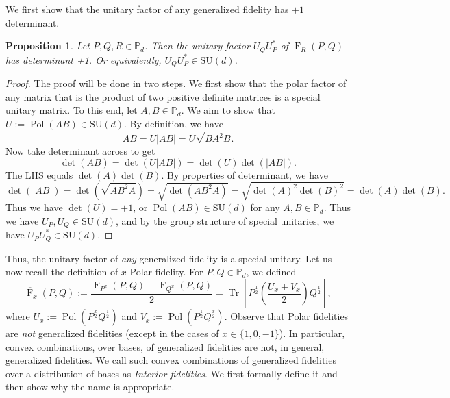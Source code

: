 \documentclass[12pt]{article}
\newtheorem{prop}[theorem]{Proposition}
\theoremstyle{definition}
\newcommand{\Fg}[3]{\operatorname{F}_{#3}\!\left(#1, #2\right)}
\begin{document}
We first show that the unitary factor of any generalized fidelity has $+1$ determinant. 
\begin{theorembox}
\begin{prop}
        Let $P,Q,R \in \mathbb P_d$. Then the unitary factor $U_Q U_P^*$ of $\operatorname{F}_R(P,Q) $ has determinant +1. Or equivalently, $U_Q U_P^* \in \mathrm{SU}(d)$.
\end{prop}
\end{theorembox}
\begin{proof}
    The proof will be done in two steps. We first show that the polar factor of any matrix that is the product of two positive definite matrices is a special unitary matrix. To this end, let $A,B \in \mathbb P_d$. We aim to show that $ U:= \operatorname{Pol}\left(AB\right) \in \mathrm{SU}(d)$. 
    By definition, we have
    \begin{equation}
        A B = U |A B| = U \sqrt{B A^2 B}.
    \end{equation}
    Now take determinant across to get
    \begin{equation}
        \det(A B) = \det(U |A B|) = \det(U) \det(|A B| ).
    \end{equation}
    The LHS equals $\det(A) \det(B)$. By properties of determinant, we have
    \begin{equation}
      \det(|AB|) =  \det(\sqrt{A B^2 A}) = \sqrt{\det(A B^2 A)} = \sqrt{\det(A)^2 \det(B)^2} = \det(A) \det(B).
    \end{equation}
    Thus we have $\det(U) = +1$, or $\operatorname{Pol}\left(A B\right) \in \mathrm{SU}(d)$ for any $A,B \in \mathbb P_d$. Thus we have $U_P, U_Q \in \mathrm{SU}(d)$, and by the group structure of special unitaries, we have $U_P U_Q^* \in \mathrm{SU}(d).$    
\end{proof}

Thus, the unitary factor of \textit{any} generalized fidelity is a special unitary.  Let us now recall the definition of $x$-Polar fidelity. For $P,Q \in \mathbb P_d$, we defined
\begin{equation}
    \overline{\operatorname{F}}_x(P,Q) := \frac{\Fg{P}{Q}{P^x} +  \Fg{P}{Q}{Q^x}}{2} = \operatorname{Tr}\left[P ^{\frac12} \left( \frac{U_x + V_x}2 \right) Q ^{\frac12} \right],
\end{equation}
where $U_x := \operatorname{Pol}\left(P^\frac x2 Q ^{\frac12} \right)$ and $V_x := \operatorname{Pol}\left(P^\frac 12 Q ^{\frac x2} \right)$. 
Observe that Polar fidelities are \textit{not} generalized fidelities (except in the cases of $x \in \{1,0,-1\}$). In particular, convex combinations, over bases, of generalized fidelities are not, in general,  generalized fidelities. We call such convex combinations of generalized fidelities over a distribution of bases as \textit{Interior fidelities}. We first formally define it and then show why the name is appropriate.
\end{document}
